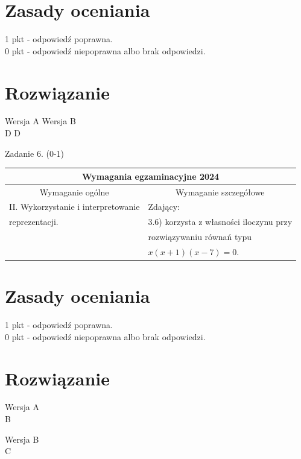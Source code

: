 \documentclass[10pt]{article}
\begin{document}
\section*{Zasady oceniania}
1 pkt - odpowiedź poprawna.\\
0 pkt - odpowiedź niepoprawna albo brak odpowiedzi.

\section*{Rozwiązanie}
Wersja A Wersja B\\
D D

Zadanie 6. (0-1)

\begin{center}
\begin{tabular}{|l|l|}
\hline
\multicolumn{2}{|c|}{Wymagania egzaminacyjne 2024} \\
\hline
\multicolumn{1}{|c|}{Wymaganie ogólne} & \multicolumn{1}{c|}{Wymaganie szczegółowe} \\
\hline
II. Wykorzystanie i interpretowanie & Zdający: \\
reprezentacji. & 3.6) korzysta z własności iloczynu przy \\
 & rozwiązywaniu równań typu \\
 & $x(x+1)(x-7)=0$. \\
\hline
\end{tabular}
\end{center}

\section*{Zasady oceniania}
1 pkt - odpowiedź poprawna.\\
0 pkt - odpowiedź niepoprawna albo brak odpowiedzi.

\section*{Rozwiązanie}
Wersja A\\
B

Wersja B\\
C
\end{document}
